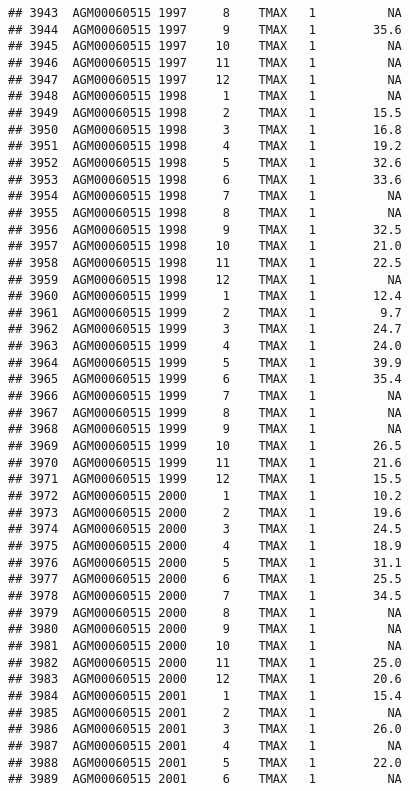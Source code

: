 \documentclass{article}\usepackage[]{graphicx}\usepackage[]{color}
\makeatletter
\newenvironment{kframe}{%
 \def\at@end@of@kframe{}%
 \ifinner\ifhmode%
  \def\at@end@of@kframe{\end{minipage}}%
  \begin{minipage}{\columnwidth}%
 \fi\fi%
 \def\FrameCommand##1{\hskip\@totalleftmargin \hskip-\fboxsep
 \colorbox{shadecolor}{##1}\hskip-\fboxsep
     \hskip-\linewidth \hskip-\@totalleftmargin \hskip\columnwidth}%
 \MakeFramed {\advance\hsize-\width
   \@totalleftmargin\z@ \linewidth\hsize
   \@setminipage}}%
 {\par\unskip\endMakeFramed%
 \at@end@of@kframe}
\newenvironment{knitrout}{}{} %
\makeatother
\begin{document}
\begin{knitrout}
\begin{kframe}
\begin{verbatim}
## 3943  AGM00060515 1997     8    TMAX   1          NA
## 3944  AGM00060515 1997     9    TMAX   1        35.6
## 3945  AGM00060515 1997    10    TMAX   1          NA
## 3946  AGM00060515 1997    11    TMAX   1          NA
## 3947  AGM00060515 1997    12    TMAX   1          NA
## 3948  AGM00060515 1998     1    TMAX   1          NA
## 3949  AGM00060515 1998     2    TMAX   1        15.5
## 3950  AGM00060515 1998     3    TMAX   1        16.8
## 3951  AGM00060515 1998     4    TMAX   1        19.2
## 3952  AGM00060515 1998     5    TMAX   1        32.6
## 3953  AGM00060515 1998     6    TMAX   1        33.6
## 3954  AGM00060515 1998     7    TMAX   1          NA
## 3955  AGM00060515 1998     8    TMAX   1          NA
## 3956  AGM00060515 1998     9    TMAX   1        32.5
## 3957  AGM00060515 1998    10    TMAX   1        21.0
## 3958  AGM00060515 1998    11    TMAX   1        22.5
## 3959  AGM00060515 1998    12    TMAX   1          NA
## 3960  AGM00060515 1999     1    TMAX   1        12.4
## 3961  AGM00060515 1999     2    TMAX   1         9.7
## 3962  AGM00060515 1999     3    TMAX   1        24.7
## 3963  AGM00060515 1999     4    TMAX   1        24.0
## 3964  AGM00060515 1999     5    TMAX   1        39.9
## 3965  AGM00060515 1999     6    TMAX   1        35.4
## 3966  AGM00060515 1999     7    TMAX   1          NA
## 3967  AGM00060515 1999     8    TMAX   1          NA
## 3968  AGM00060515 1999     9    TMAX   1          NA
## 3969  AGM00060515 1999    10    TMAX   1        26.5
## 3970  AGM00060515 1999    11    TMAX   1        21.6
## 3971  AGM00060515 1999    12    TMAX   1        15.5
## 3972  AGM00060515 2000     1    TMAX   1        10.2
## 3973  AGM00060515 2000     2    TMAX   1        19.6
## 3974  AGM00060515 2000     3    TMAX   1        24.5
## 3975  AGM00060515 2000     4    TMAX   1        18.9
## 3976  AGM00060515 2000     5    TMAX   1        31.1
## 3977  AGM00060515 2000     6    TMAX   1        25.5
## 3978  AGM00060515 2000     7    TMAX   1        34.5
## 3979  AGM00060515 2000     8    TMAX   1          NA
## 3980  AGM00060515 2000     9    TMAX   1          NA
## 3981  AGM00060515 2000    10    TMAX   1          NA
## 3982  AGM00060515 2000    11    TMAX   1        25.0
## 3983  AGM00060515 2000    12    TMAX   1        20.6
## 3984  AGM00060515 2001     1    TMAX   1        15.4
## 3985  AGM00060515 2001     2    TMAX   1          NA
## 3986  AGM00060515 2001     3    TMAX   1        26.0
## 3987  AGM00060515 2001     4    TMAX   1          NA
## 3988  AGM00060515 2001     5    TMAX   1        22.0
## 3989  AGM00060515 2001     6    TMAX   1          NA

\end{verbatim}
\end{kframe}
\end{knitrout}
\end{document}
